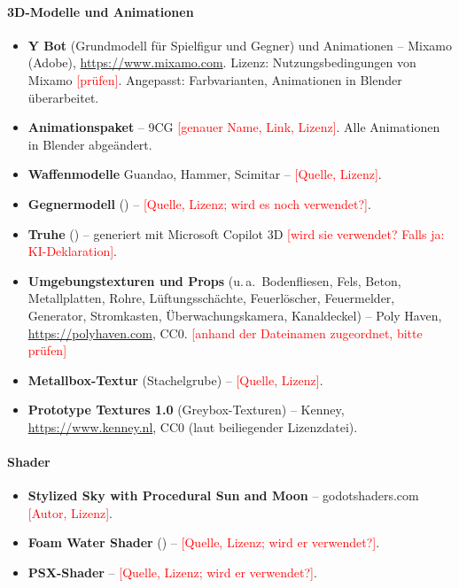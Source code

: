 \documentclass[../Main.tex]{subfiles}
\begin{document}
\paragraph{3D-Modelle und Animationen}
\begin{itemize}[leftmargin=1.5cm]
\item \textbf{Y Bot} (Grundmodell für Spielfigur und Gegner) und Animationen -- Mixamo (Adobe), \url{https://www.mixamo.com}. Lizenz: Nutzungsbedingungen von Mixamo \textcolor{red}{[prüfen]}. Angepasst: Farbvarianten, Animationen in Blender überarbeitet.
\item \textbf{Animationspaket} -- 9CG \textcolor{red}{[genauer Name, Link, Lizenz]}. Alle Animationen in Blender abgeändert.
\item \textbf{Waffenmodelle} Guandao, Hammer, Scimitar -- \textcolor{red}{[Quelle, Lizenz]}.
\item \textbf{Gegnermodell} () -- \textcolor{red}{[Quelle, Lizenz; wird es noch verwendet?]}.
\item \textbf{Truhe} () -- generiert mit Microsoft Copilot 3D \textcolor{red}{[wird sie verwendet? Falls ja: KI-Deklaration]}.
\item \textbf{Umgebungstexturen und Props} (u.\,a.\ Bodenfliesen, Fels, Beton, Metallplatten, Rohre, Lüftungsschächte, Feuerlöscher, Feuermelder, Generator, Stromkasten, Überwachungskamera, Kanaldeckel) -- Poly Haven, \url{https://polyhaven.com}, CC0. \textcolor{red}{[anhand der Dateinamen zugeordnet, bitte prüfen]}
\item \textbf{Metallbox-Textur} (Stachelgrube) -- \textcolor{red}{[Quelle, Lizenz]}.
\item \textbf{Prototype Textures 1.0} (Greybox-Texturen) -- Kenney, \url{https://www.kenney.nl}, CC0 (laut beiliegender Lizenzdatei).
\end{itemize}

\paragraph{Shader}
\begin{itemize}[leftmargin=1.5cm]
\item \textbf{Stylized Sky with Procedural Sun and Moon} -- godotshaders.com \textcolor{red}{[Autor, Lizenz]}.
\item \textbf{Foam Water Shader} () -- \textcolor{red}{[Quelle, Lizenz; wird er verwendet?]}.
\item \textbf{PSX-Shader} -- \textcolor{red}{[Quelle, Lizenz; wird er verwendet?]}.
\end{itemize}
\end{document}
